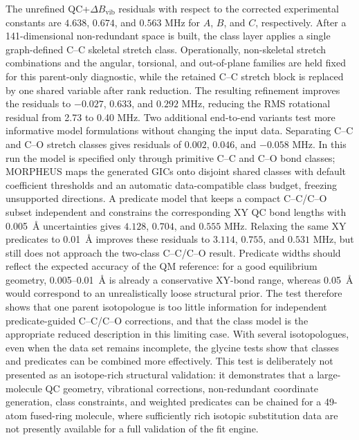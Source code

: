 \documentclass[aip,jcp,reprint,longbibliography,floatfix]{revtex4-2}
\begin{document}
The unrefined QC+$\Delta B_\mathrm{vib}$ residuals with respect to the corrected
experimental constants are $4.638$, $0.674$, and $0.563$ MHz for $A$, $B$, and
$C$, respectively. After a 141-dimensional non-redundant space is built, the
class layer applies a single graph-defined C--C skeletal stretch class.
Operationally, non-skeletal stretch combinations and the angular, torsional,
and out-of-plane families are held fixed for this parent-only diagnostic, while
the retained C--C stretch block is replaced by one shared variable after rank
reduction. The resulting refinement improves the residuals to $-0.027$,
$0.633$, and $0.292$ MHz, reducing the RMS rotational residual from 2.73 to
0.40 MHz. Two additional end-to-end variants test more informative model
formulations without changing the input data. Separating C--C and C--O stretch
classes gives residuals of $0.002$, $0.046$, and $-0.058$ MHz. In this run the
model is specified only through primitive C--C and C--O bond classes; MORPHEUS
maps the generated GICs onto disjoint shared classes with default coefficient
thresholds and an automatic data-compatible class budget, freezing unsupported
directions.
A predicate model that keeps a compact C--C/C--O subset independent and
constrains the corresponding XY QC bond lengths with 0.005~\AA{} uncertainties
gives $4.128$, $0.704$, and $0.555$ MHz. Relaxing the same XY predicates to
0.01~\AA{} improves these residuals to $3.114$, $0.755$, and $0.531$ MHz, but
still does not approach the two-class C--C/C--O result. Predicate widths should
reflect the expected accuracy of the QM reference: for a good equilibrium
geometry, 0.005--0.01~\AA{} is already a conservative XY-bond range, whereas
0.05~\AA{} would correspond to an unrealistically loose structural prior. The
test therefore shows that one parent isotopologue is too little information for
independent predicate-guided C--C/C--O corrections, and that the class model is
the appropriate reduced description in this limiting case. With several
isotopologues, even when the data set remains incomplete, the glycine tests show
that classes and predicates can be combined more effectively.
This test is deliberately not presented as an isotope-rich
structural validation: it demonstrates that a large-molecule QC geometry,
vibrational corrections, non-redundant coordinate generation, class constraints,
and weighted predicates can be chained for a 49-atom fused-ring molecule, where
sufficiently rich isotopic substitution data are not presently available for a
full validation of the fit engine.
\end{document}
